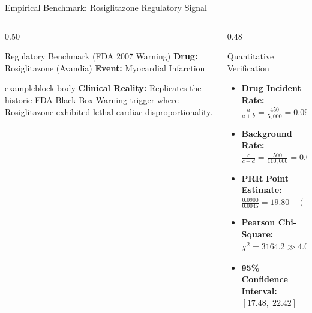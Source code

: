 \documentclass[11pt, aspectratio=169]{beamer}
\begin{document}
\begin{frame}{Empirical Benchmark: Rosiglitazone Regulatory Signal}
\footnotesize
\begin{columns}[T]
  \begin{column}{0.50\textwidth}
    \begin{block}{\footnotesize Regulatory Benchmark (FDA 2007 Warning)}
      \centering\scriptsize
      \textbf{Drug:} Rosiglitazone (Avandia) \quad \textbf{Event:} Myocardial Infarction
    \end{block}
    \vspace{0.03cm}
    
    \vspace{0.06cm}
    \begin{beamercolorbox}[wd=\linewidth,rounded=true,sep=4pt]{exampleblock body}
      \scriptsize \textbf{Clinical Reality:} Replicates the historic FDA Black-Box Warning trigger where Rosiglitazone exhibited lethal cardiac disproportionality.
    \end{beamercolorbox}
  \end{column}

  \begin{column}{0.48\textwidth}
    \begin{block}{\footnotesize Quantitative Verification}
      \scriptsize
      \begin{itemize}\scriptsize
        \item \textbf{Drug Incident Rate:} $\frac{a}{a+b} = \frac{450}{5,000} = \mathbf{0.0900} \; (9.00\%)$
        \item \textbf{Background Rate:} $\frac{c}{c+d} = \frac{500}{110,000} = \mathbf{0.0045} \; (0.45\%)$
        \item \textbf{PRR Point Estimate:} $\frac{0.0900}{0.0045} = \mathbf{19.80} \quad (\gg 2.0)$
        \item \textbf{Pearson Chi-Square:} $\chi^2 = \mathbf{3164.2} \gg 4.0 \; (p < 10^{-10})$
        \item \textbf{95\% Confidence Interval:} $[\mathbf{17.48}, \; \mathbf{22.42}]$
      \end{itemize}
    \end{block}
  \end{column}
\end{columns}
\end{frame}
\end{document}

